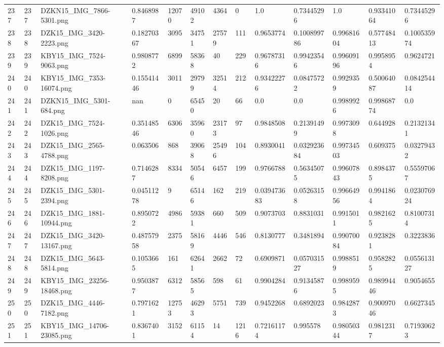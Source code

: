 \documentclass[11pt, a4paper, twoside]{report}
\begin{document}
\begin{longtable}[c]{@{}lllllllllllll@{}}
237 & 237 & DZKN15\_IMG\_7866-5301.png & 0.8468987 & 12070 & 49102 & 4364 & 0 & 1.0 & 0.73445296 & 1.0 & 0.93341064 & 0.73445296 \\
238 & 238 & DZK15\_IMG\_3420-2223.png & 0.18270367 & 3095 & 34751 & 27579 & 111 & 0.9653774 & 0.100899786 & 0.99681604 & 0.57748413 & 0.100535974 \\
239 & 239 & KBY15\_IMG\_7524-9063.png & 0.9808772 & 6899 & 58368 & 40 & 229 & 0.96787316 & 0.99423546 & 0.99609196 & 0.9958954 & 0.9624721 \\
240 & 240 & KBY15\_IMG\_7353-16074.png & 0.15541446 & 3011 & 29799 & 32514 & 212 & 0.93422276 & 0.08475722 & 0.9929359 & 0.50064087 & 0.084254414 \\
241 & 241 & DZKN15\_IMG\_5301-684.png & nan & 0 & 65450 & 20 & 66 & 0.0 & 0.0 & 0.9989926 & 0.99868774 & 0.0 \\
242 & 242 & DZK15\_IMG\_7524-1026.png & 0.35148546 & 6306 & 35960 & 23173 & 97 & 0.9848508 & 0.21391499 & 0.9973098 & 0.644928 & 0.21321341 \\
243 & 243 & DZK15\_IMG\_2565-4788.png & 0.063506 & 868 & 39068 & 25496 & 104 & 0.8930041 & 0.032923684 & 0.99734503 & 0.609375 & 0.03279432 \\
244 & 244 & DZK15\_IMG\_1197-8208.png & 0.7146287 & 8334 & 50546 & 6457 & 199 & 0.9766788 & 0.56345075 & 0.99607843 & 0.8984375 & 0.55597067 \\
245 & 245 & DZK15\_IMG\_5301-2394.png & 0.04511278 & 9 & 65146 & 162 & 219 & 0.039473683 & 0.05263158 & 0.99664956 & 0.9941864 & 0.023076924 \\
246 & 246 & DZK15\_IMG\_1881-10944.png & 0.8950722 & 4986 & 59381 & 660 & 509 & 0.9073703 & 0.8831031 & 0.9915011 & 0.9821625 & 0.81007314 \\
247 & 247 & DZK15\_IMG\_3420-13167.png & 0.48757958 & 2375 & 58169 & 4446 & 546 & 0.8130777 & 0.3481894 & 0.99070084 & 0.9238281 & 0.3223836 \\
248 & 248 & DZK15\_IMG\_5643-5814.png & 0.1053665 & 161 & 62641 & 2662 & 72 & 0.6909871 & 0.057031527 & 0.9988519 & 0.9582825 & 0.055613127 \\
249 & 249 & KBY15\_IMG\_23256-18468.png & 0.9503877 & 6312 & 58565 & 598 & 61 & 0.9904284 & 0.91345876 & 0.9989595 & 0.98994446 & 0.9054655 \\
250 & 250 & DZK15\_IMG\_4446-7182.png & 0.7971621 & 12753 & 46293 & 5751 & 739 & 0.9452268 & 0.6892023 & 0.9842873 & 0.90097046 & 0.6627345 \\
251 & 251 & KBY15\_IMG\_14706-23085.png & 0.8367401 & 3152 & 61154 & 14 & 1216 & 0.72161174 & 0.995578 & 0.98050344 & 0.9812317 & 0.71930623 \\

\end{longtable}
\end{document}
